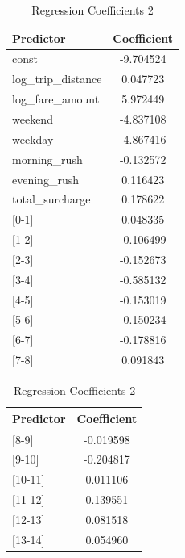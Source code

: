 \documentclass[11pt]{article}
\begin{document}
\begin{table}[h]
    \centering
    \begin{minipage}{.5\textwidth}
        \centering
        \caption{Regression Coefficients 1}
        \label{tab:coefficients1}
        \begin{tabular}{lc}
            \toprule
            Predictor & Coefficient \\
            \midrule
            const & -9.704524 \\
            log\_trip\_distance & 0.047723 \\
            log\_fare\_amount & 5.972449 \\
            weekend & -4.837108 \\
            weekday & -4.867416 \\
            morning\_rush & -0.132572 \\
            evening\_rush & 0.116423 \\
            total\_surcharge & 0.178622 \\
            {[0-1]} & 0.048335 \\
            {[1-2]} & -0.106499 \\
            {[2-3]} & -0.152673 \\
            {[3-4]} & -0.585132 \\
            {[4-5]} & -0.153019 \\
            {[5-6]} & -0.150234 \\
            {[6-7]} & -0.178816 \\
            {[7-8]} & 0.091843 \\
            \bottomrule
        \end{tabular}
    \end{minipage}%
    \begin{minipage}{.5\textwidth}
        \centering
        \caption{Regression Coefficients 2}
        \label{tab:coefficients2}
        \begin{tabular}{lc}
            \toprule
            Predictor & Coefficient \\
            \midrule
            {[8-9]} & -0.019598 \\
            {[9-10]} & -0.204817 \\
            {[10-11]} & 0.011106 \\
            {[11-12]} & 0.139551 \\
            {[12-13]} & 0.081518 \\
            {[13-14]} & 0.054960 \\

\end{tabular}
\end{minipage}
\end{table}
\end{document}
